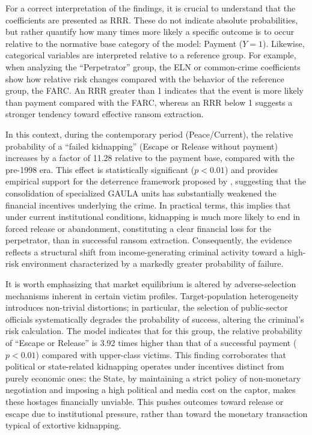 \documentclass[12pt,a4paper]{article}
\providecommand{\textcite}{\citet}
\theoremstyle{plain}
\theoremstyle{definition}
\theoremstyle{remark}
\newcommand{\1}{\mathbf{1}}
\begin{document}
For a correct interpretation of the findings, it is crucial to understand that the coefficients are presented as RRR. These do not indicate absolute probabilities, but rather quantify how many times more likely a specific outcome is to occur relative to the normative base category of the model: Payment (\(Y=1\)). Likewise, categorical variables are interpreted relative to a reference group. For example, when analyzing the ``Perpetrator'' group, the ELN or common-crime coefficients show how relative risk changes compared with the behavior of the reference group, the FARC. An RRR greater than 1 indicates that the event is more likely than payment compared with the FARC, whereas an RRR below 1 suggests a stronger tendency toward effective ransom extraction.

In this context, during the contemporary period (Peace/Current), the relative probability of a ``failed kidnapping'' (Escape or Release without payment) increases by a factor of 11.28 relative to the payment base, compared with the pre-1998 era. This effect is statistically significant (\(p<0.01\)) and provides empirical support for the deterrence framework proposed by \textcite{Mejia2000Secuestro}, suggesting that the consolidation of specialized GAULA units has substantially weakened the financial incentives underlying the crime. In practical terms, this implies that under current institutional conditions, kidnapping is much more likely to end in forced release or abandonment, constituting a clear financial loss for the perpetrator, than in successful ransom extraction. Consequently, the evidence reflects a structural shift from income-generating criminal activity toward a high-risk environment characterized by a markedly greater probability of failure.

It is worth emphasizing that market equilibrium is altered by adverse-selection mechanisms inherent in certain victim profiles. Target-population heterogeneity introduces non-trivial distortions; in particular, the selection of public-sector officials systematically degrades the probability of success, altering the criminal's risk calculation. The model indicates that for this group, the relative probability of ``Escape or Release'' is 3.92 times higher than that of a successful payment (\(p<0.01\)) compared with upper-class victims. This finding corroborates that political or state-related kidnapping operates under incentives distinct from purely economic ones: the State, by maintaining a strict policy of non-monetary negotiation and imposing a high political and media cost on the captor, makes these hostages financially unviable. This pushes outcomes toward release or escape due to institutional pressure, rather than toward the monetary transaction typical of extortive kidnapping.
\end{document}
